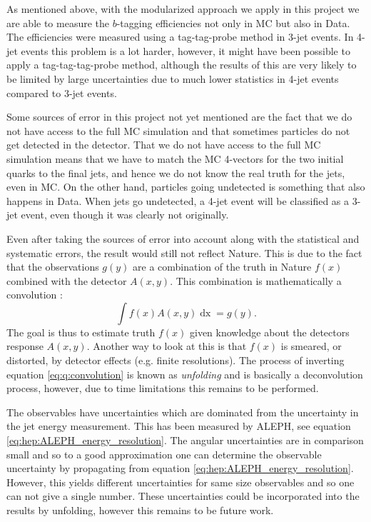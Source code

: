 As mentioned above, with the modularized approach we apply in this project we are able to measure the $b$-tagging efficiencies not only in MC but also in Data. The efficiencies were measured using a tag-tag-probe method in 3-jet events. In 4-jet events this problem is a lot harder, however, it might have been possible to apply a tag-tag-tag-probe method, although the results of this are very likely to be limited by large uncertainties due to much lower statistics in 4-jet events compared to 3-jet events. 

Some sources of error in this project not yet mentioned are the fact that we do not have access to the full MC simulation and that sometimes particles do not get detected in the detector. That we do not have access to the full MC simulation means that we have to match the MC 4-vectors for the two initial quarks to the final jets, and hence we do not know the real truth for the jets, even in MC. On the other hand, particles going undetected is something that also happens in Data. When jets go undetected, a 4-jet event will be classified as a 3-jet event, even though it was clearly not originally. 

Even after taking the sources of error into account along with the statistical and systematic errors, the result would still not reflect Nature. This is due to the fact that the observations $g(y)$ are a combination of the truth in Nature $f(x)$ combined with the detector $A(x, y)$. This combination is mathematically a convolution \autocite{schmittDataUnfoldingMethods2017}: 
\begin{equation}
  \label{eq:q:convolution}
  \int f(x) A(x, y) \mathop{dx} = g(y).
\end{equation}
The goal is thus to estimate truth $f(x)$ given knowledge about the detectors response $A(x,y)$. Another way to look at this is that $f(x)$ is smeared, or distorted, by detector effects (e.g. finite resolutions). The process of inverting equation \eqref{eq:q:convolution} is known as \emph{unfolding} and is basically a deconvolution process, however, due to time limitations this remains to be performed. 

The observables have uncertainties which are dominated from the uncertainty in the jet energy measurement. This has been measured by ALEPH, see equation \eqref{eq:hep:ALEPH_energy_resolution}. The angular uncertainties are in comparison small and so to a good approximation one can determine the observable uncertainty by propagating from equation \eqref{eq:hep:ALEPH_energy_resolution}. However, this yields different uncertainties for same size observables and so one can not give a single number. These uncertainties could be incorporated into the results by unfolding, however this remains to be future work. 

